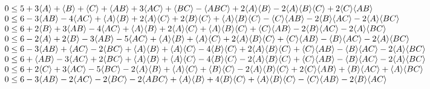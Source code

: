 {\begin{align*}
\begin{array}{l}
 0
\leq
{5 + 3 \langle A\rangle + \langle B\rangle + \langle C\rangle + \langle A B\rangle + 3 \langle A C\rangle + \langle B C\rangle -\langle A B C\rangle + 2 \langle A\rangle \langle B\rangle -2 \langle A\rangle \langle B\rangle \langle C\rangle + 2 \langle C\rangle \langle A B\rangle} \\
 0
\leq
{6 -3 \langle A B\rangle -4 \langle A C\rangle + \langle A\rangle \langle B\rangle + 2 \langle A\rangle \langle C\rangle + 2 \langle B\rangle \langle C\rangle + \langle A\rangle \langle B\rangle \langle C\rangle -\langle C\rangle \langle A B\rangle -2 \langle B\rangle \langle A C\rangle -2 \langle A\rangle \langle B
   C\rangle} \\
 0
\leq
{6 + 2 \langle B\rangle + 3 \langle A B\rangle -4 \langle A C\rangle + \langle A\rangle \langle B\rangle + 2 \langle A\rangle \langle C\rangle + \langle A\rangle \langle B\rangle \langle C\rangle + \langle C\rangle \langle A B\rangle -2 \langle B\rangle \langle A C\rangle -2 \langle A\rangle \langle B C\rangle} \\
 0
\leq
{6 -2 \langle A\rangle + 2 \langle B\rangle -3 \langle A B\rangle -5 \langle A C\rangle + \langle A\rangle \langle B\rangle + \langle A\rangle \langle C\rangle + 2 \langle A\rangle \langle B\rangle \langle C\rangle + \langle C\rangle \langle A B\rangle -\langle B\rangle \langle A C\rangle -2 \langle A\rangle \langle B
   C\rangle} \\
 0
\leq
{6 -3 \langle A B\rangle + \langle A C\rangle -2 \langle B C\rangle + \langle A\rangle \langle B\rangle + \langle A\rangle \langle C\rangle -4 \langle B\rangle \langle C\rangle + 2 \langle A\rangle \langle B\rangle \langle C\rangle + \langle C\rangle \langle A B\rangle -\langle B\rangle \langle A C\rangle -2 \langle A\rangle
   \langle B C\rangle} \\
 0
\leq
{6 + \langle A B\rangle -3 \langle A C\rangle + 2 \langle B C\rangle + \langle A\rangle \langle B\rangle + \langle A\rangle \langle C\rangle -4 \langle B\rangle \langle C\rangle -2 \langle A\rangle \langle B\rangle \langle C\rangle + \langle C\rangle \langle A B\rangle -\langle B\rangle \langle A C\rangle -2 \langle A\rangle
   \langle B C\rangle} \\
 0
\leq
{6 + 2 \langle C\rangle + 3 \langle A C\rangle -5 \langle B C\rangle -2 \langle A\rangle \langle B\rangle + \langle A\rangle \langle C\rangle + \langle B\rangle \langle C\rangle -2 \langle A\rangle \langle B\rangle \langle C\rangle + 2 \langle C\rangle \langle A B\rangle + \langle B\rangle \langle A C\rangle + \langle A\rangle
   \langle B C\rangle} \\
 0
\leq
{6 -3 \langle A B\rangle -2 \langle A C\rangle -2 \langle B C\rangle -2 \langle A B C\rangle + \langle A\rangle \langle B\rangle + 4 \langle B\rangle \langle C\rangle + \langle A\rangle \langle B\rangle \langle C\rangle -\langle C\rangle \langle A B\rangle -2 \langle B\rangle \langle A C\rangle} \\
\end{array}
\end{align*}

\clearpage


\setlength{\bibsep}{3pt plus 3pt minus 2pt}

\nocite{apsrev41Control}




}
